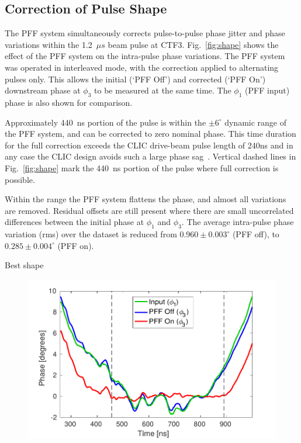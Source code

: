 \documentclass[%
 reprint,
 superscriptaddress,
 amsmath,
 amssymb,
 prstab,
]{revtex4-1}
\begin{document}
\subsection{\label{ss:meanJit}Correction of Pulse Shape}
The PFF system simultaneously corrects pulse-to-pulse phase jitter and phase 
variations within the 1.2~\(\mu s\) beam pulse at CTF3. 
Fig.~\ref{fig:shape} shows the effect of the PFF system on the intra-pulse 
phase variations. The PFF system was operated in interleaved mode, with 
the correction applied to alternating pulses only. This allows 
the initial (`PFF Off') and corrected (`PFF On') downstream phase at \(\phi_3\)
to be measured at the same time. The \(\phi_1\) (PFF input) phase 
is also shown for comparison. 

Approximately 440~ns portion of the pulse is 
within the \(\pm 6^\circ\) dynamic range of the PFF system, and can be 
corrected to zero nominal phase. 
This time duration for the full correction exceeds the CLIC drive-beam pulse 
length of 240ns and in any case the CLIC design avoids such 
a large phase sag~\cite{CLICCDR}. 
Vertical dashed lines in Fig.~\ref{fig:shape} mark the 440~ns portion of 
the pulse where full correction is possible.

Within the range the PFF system flattens the phase, and almost all variations 
are removed. 
Residual offsets are still present where there are small uncorrelated 
differences between the initial phase at \(\phi_1\) and \(\phi_3\). 
The average intra-pulse phase variation (rms) over the dataset is reduced from 
\(0.960\pm0.003^\circ\) (PFF off), to \(0.285\pm0.004^\circ\) (PFF on).

Best shape

\begin{figure}
	\includegraphics[width=\columnwidth]{figs/res/shape}%
	\caption{\label{f:shape}
	}
\end{figure}
\end{document}
